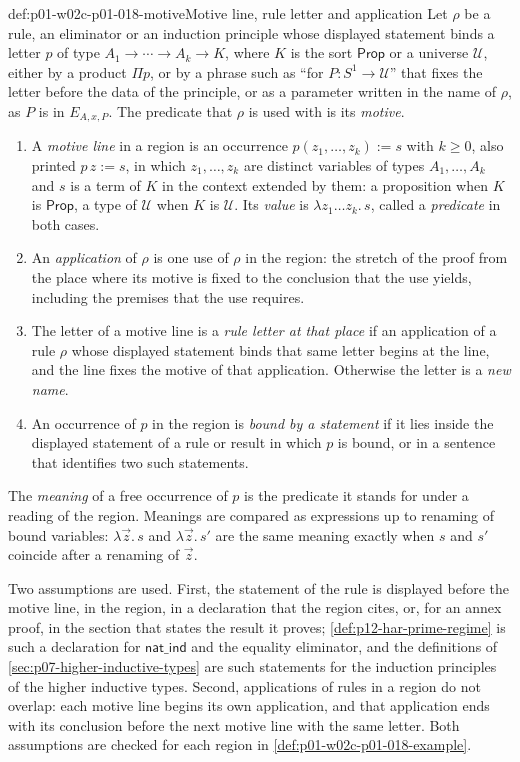 \begin{hbdefinition}{def:p01-w02c-p01-018-motive}{Motive line, rule letter and application}
Let \(\rho\) be a rule, an eliminator or an induction principle whose
displayed statement binds a letter \(p\) of type
\(A_1\to\cdots\to A_k\to K\), where \(K\) is the sort \(\mathsf{Prop}\) or
a universe \(\mathcal U\), either by a product \(\Pi p\), or by a phrase
such as ``for \(P:S^1\to\mathcal U\)'' that fixes the letter before the
data of the principle, or
as a parameter written in the name of \(\rho\), as \(P\) is in
\(E_{A,x,P}\).  The predicate that \(\rho\) is used with is its
\emph{motive}.
\begin{enumerate}
  \item A \emph{motive line} in a region is an occurrence
  \(p(z_1,\ldots,z_k):=s\) with \(k\geq0\), also printed \(p\,z:=s\), in
  which
  \(z_1,\ldots,z_k\) are distinct variables of types
  \(A_1,\ldots,A_k\) and \(s\) is a term of \(K\) in the context extended
  by them: a proposition when \(K\) is \(\mathsf{Prop}\), a type of
  \(\mathcal U\) when \(K\) is \(\mathcal U\).  Its \emph{value} is
  \(\lambda z_1\ldots z_k.\,s\), called a \emph{predicate} in both cases.
  \item An \emph{application} of \(\rho\) is one use of \(\rho\) in the
  region: the stretch of the proof from the place where its motive is
  fixed to the conclusion that the use yields, including the premises
  that the use requires.
  \item The letter of a motive line is a \emph{rule letter at that place}
  if an application of a rule \(\rho\) whose displayed statement binds
  that same letter begins at the line, and the line fixes the motive of
  that application.  Otherwise the letter is a \emph{new name}.
  \item An occurrence of \(p\) in the region is \emph{bound by a
  statement} if it lies inside the displayed statement of a rule or
  result in which \(p\) is bound, or in a sentence that identifies two
  such statements.
\end{enumerate}
The \emph{meaning} of a free occurrence of \(p\) is the predicate it
stands for under a reading of the region.  Meanings are compared as
expressions up to renaming of bound variables: \(\lambda\vec z.\,s\) and
\(\lambda\vec z.\,s'\) are the same meaning exactly when \(s\) and \(s'\)
coincide after a renaming of \(\vec z\).
\end{hbdefinition}

Two assumptions are used.  First, the statement of the rule is displayed
before the motive line, in the region, in a declaration that the region
cites, or, for an annex proof, in the section that states the result it
proves; \cref{def:p12-har-prime-regime} is such a declaration for
\(\mathsf{nat\_ind}\) and the equality eliminator, and the definitions of
\cref{sec:p07-higher-inductive-types} are such statements for the induction
principles of the higher inductive types.  Second, applications
of rules in a region do not overlap: each motive line begins its own
application, and that application ends with its conclusion before the
next motive line with the same letter.  Both assumptions are checked for
each region in \cref{def:p01-w02c-p01-018-example}.

